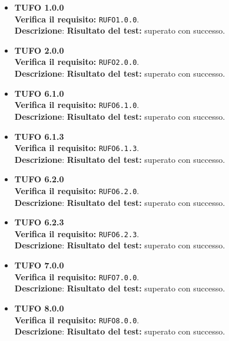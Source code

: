 \begin{itemize}
\item \textbf{TUFO 1.0.0}\\
\textbf{Verifica il requisito:} \texttt{RUFO1.0.0}.\\
\textbf{Descrizione}: %
\textbf{Risultato del test:} superato con successo.

\item \textbf{TUFO 2.0.0}\\
\textbf{Verifica il requisito:} \texttt{RUFO2.0.0}.\\
\textbf{Descrizione}: %
\textbf{Risultato del test:} superato con successo.

\item \textbf{TUFO 6.1.0}\\
\textbf{Verifica il requisito:} \texttt{RUFO6.1.0}.\\
\textbf{Descrizione}: %
\textbf{Risultato del test:} superato con successo.

\item \textbf{TUFO 6.1.3}\\
\textbf{Verifica il requisito:} \texttt{RUFO6.1.3}.\\
\textbf{Descrizione}: %
\textbf{Risultato del test:} superato con successo.

\item \textbf{TUFO 6.2.0}\\
\textbf{Verifica il requisito:} \texttt{RUFO6.2.0}.\\
\textbf{Descrizione}: %
\textbf{Risultato del test:} superato con successo.

\item \textbf{TUFO 6.2.3}\\
\textbf{Verifica il requisito:} \texttt{RUFO6.2.3}.\\
\textbf{Descrizione}: %
\textbf{Risultato del test:} superato con successo.

\item \textbf{TUFO 7.0.0}\\
\textbf{Verifica il requisito:} \texttt{RUFO7.0.0}.\\
\textbf{Descrizione}: %
\textbf{Risultato del test:} superato con successo.

\item \textbf{TUFO 8.0.0}\\
\textbf{Verifica il requisito:} \texttt{RUFO8.0.0}.\\
\textbf{Descrizione}: %
\textbf{Risultato del test:} superato con successo.


\end{itemize}

